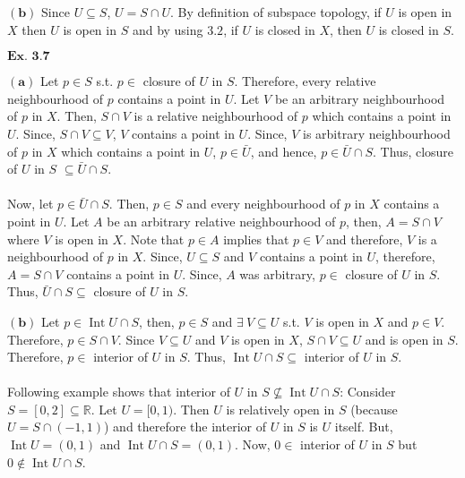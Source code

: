 \documentclass{article}
\begin{document}
$\mathbf{(b)}$ Since $U \subseteq S$, $U = S \cap U$. By definition of subspace topology, if $U$ is open in $X$ then $U$ is open in $S$ and by using $\mathbf{3.2}$, if $U$ is closed in $X$, then $U$ is closed in $S$.

\vspace{0.2in}

${\textbf{Ex. 3.7}}$

$\mathbf{(a)}$ Let $p \in S$ s.t. $p \in $ closure of $U$ in $S$. Therefore, every relative neighbourhood of $p$ contains a point in $U$. Let $V$ be an arbitrary neighbourhood of $p$ in $X$. Then, $S \cap V$ is a relative neighbourhood of $p$ which contains a point in $U$. Since, $S\cap V \subseteq V$, $V$ contains a point in $U$. Since, $V$ is arbitrary neighbourhood of $p$ in $X$ which contains a point in $U$, $p \in \bar{U}$, and hence, $p \in \bar{U} \cap S$. Thus, closure of $U$ in $S$ $\subseteq \bar{U} \cap S$.\\~\\

Now, let $p \in \bar{U} \cap S$. Then, $p\in S$ and every neighbourhood of $p$ in $X$ contains a point in $U$. Let $A$ be an arbitrary relative neighbourhood of $p$, then, $A = S \cap V$ where $V$ is open in $X$. Note that $p \in A$ implies that $p \in V$ and therefore, $V$ is a neighbourhood of $p$ in $X$. Since, $U \subseteq S$ and $V$ contains a point in $U$, therefore, $A =S \cap V$ contains a point in $U$. Since, $A$ was arbitrary, $p \in $ closure of $U$ in $S$. Thus, $\bar{U} \cap S \subseteq$ closure of $U$ in $S$.

$\mathbf{(b)}$ Let $p \in \operatorname{Int}U \cap S$, then, $p \in S$ and $\exists\ V \subseteq U$ s.t. $V$ is open in $X$ and $p \in V$. Therefore, $p \in S \cap V$. Since $V \subseteq U$ and $V$ is open in $X$, $S \cap V \subseteq U$ and is open in $S$. Therefore, $p \in $ interior of $U$ in $S$. Thus, $\operatorname{Int}U \cap S \subseteq$ interior of $U$ in $S$.\\~\\

Following example shows that interior of $U$ in $S \not\subseteq \operatorname{Int}U \cap S$: Consider $S = [0,2] \subseteq \mathbb{R}$. Let $U = [0,1)$. Then $U$ is relatively open in $S$ (because $U = S\cap(-1,1)$) and therefore the interior of $U$ in $S$ is $U$ itself. But, $\operatorname{Int}U = (0,1)$ and $\operatorname{Int}U\cap S = (0,1)$. Now, $0 \in $ interior of $U$ in $S$ but $0 \not\in\operatorname{Int}U\cap S$.
\end{document}
